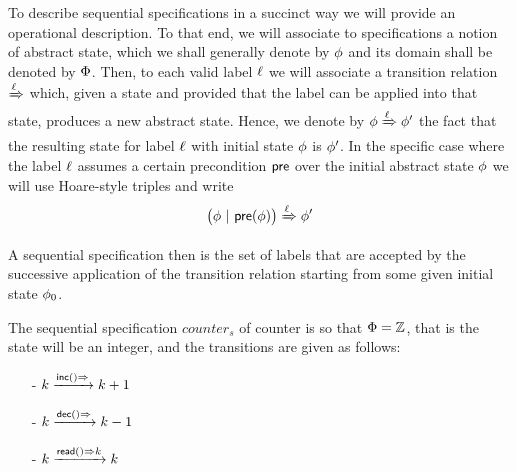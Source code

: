To describe sequential specifications in a succinct way we will
provide an operational description.
To that end, we will associate to specifications a notion of abstract
state, which we shall generally denote by $\abstate$ and its domain
shall be denoted by $\abstates$.
Then, to each valid label $\alabel$ we will associate a transition
relation \;$\xRightarrow{\alabel}$\; which, given a state and provided
that the label can be applied into that state, produces a new abstract
state.
Hence, we denote by $\abstate \xRightarrow{\alabel}  \abstate'$
the fact that
the resulting state for label $\alabel$ with initial state $\abstate$
is $\abstate'$.
%
In the specific case where the label $\alabel$ assumes a certain
precondition $\apre$ over the initial abstract state $\abstate$ we
will use Hoare-style triples and write
\[ \big(\abstate\ |\ \apre(\abstate)\big) \xRightarrow{\alabel}  \abstate' \]

A sequential specification then is the set of labels that are accepted
by the successive application of the transition relation starting from
some given initial state $\abstate_{0}$.



\begin{example}
\label{definition:sequential specification of counter}
The sequential specification $\mathit{counter}_s$ of counter is so
that $\abstates = \mathbb{Z}$, that is the state will be an integer,
and the transitions are given as follows:
\begin{itemize}
\setlength{\itemsep}{0.5pt}
\item[-] $k \xrightarrow{\alabellong[\mathsf{inc}]{}{}} k+1$
\item[-] $k \xrightarrow{\alabellong[\mathsf{dec}]{}{}} k-1$
\item[-] $k \xrightarrow{\alabellong[\mathsf{read}]{}{k}} k$
\end{itemize}
\end{example}


